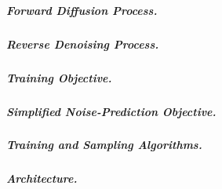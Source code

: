 \label{eq:ddpm_joint}
\label{eq:ddpm_forward}

\subparagraph{Forward Diffusion Process.}

\label{eq:ddpm_forward_marginal}
\label{eq:reparameterization_of_xt}

\subparagraph{Reverse Denoising Process.}

\label{eq:ddpm_reverse}
\label{eq:true_reverse_posterior}

\subparagraph{Training Objective.}

\label{eq:elbo_ddpm_raw}
\label{eq:elbo_ddpm_kl}

\subparagraph{Simplified Noise-Prediction Objective.}

\label{eq:L_t_mse_form}

\label{eq:reverse_mean_eps_param}

\label{eq:ddpm_simple_loss}

\subparagraph{Training and Sampling Algorithms.}

\subparagraph{Architecture.}
